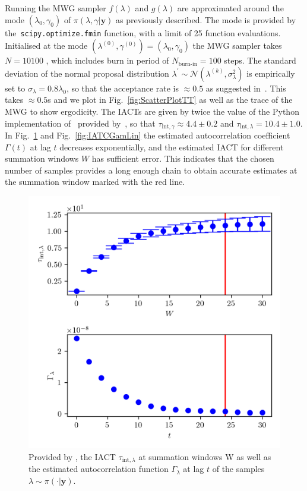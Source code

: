 Running the MWG sampler $f(\lambda)$ and $g(\lambda)$ are approximated around the mode $( \lambda_{0}, \gamma_0 )$ of $\pi(\lambda,\gamma| \bm{y})$ as previously described. 
The mode is provided by \linebreak the~\texttt{scipy.optimize.fmin} function, with a limit of 25 function evaluations.
Initialised at the mode $(\lambda^{(0)} , \gamma^{(0)}  ) = ( \lambda_{0} , \gamma_{0}  )$ the MWG sampler takes $N = 10100$ , which includes burn in period of $N_{\text{burn-in}} = 100$ steps.
The standard deviation of the normal proposal distribution $\lambda^{\prime} \sim \mathcal{N}(\lambda^{(k)} , \sigma^2_{\lambda})$ is empirically set to $\sigma_{\lambda} = 0.8 \lambda_0$, so that the acceptance rate is $\approx 0.5$ as suggested in~\cite{robertsLecNot}.
This takes  $\approx 0.5$s and we plot in Fig.~\ref{fig:ScatterPlotTT} as well as the trace of the MWG to show ergodicity.
The IACTs are given by twice the value of the Python implementation of~\cite{wolff2004monte} provided by~\cite{drikHesse}, so that $\tau_{\text{int}, \gamma} \approx 4.4 \pm 0.2$ and $\tau_{\text{int}, \lambda} = 10.4 \pm 1.0 $.
In Fig.~\ref{fig:IATCLamLin} and Fig.~\ref{fig:IATCGamLin} the estimated autocorrelation coefficient $\Gamma(t)$ at lag $t$ decreases exponentially, and the estimated IACT for different summation windows $W$ has sufficient error.
This indicates that the chosen number of samples provides a long enough chain to obtain accurate estimates at the summation window marked with the red line.
\begin{figure}[h!]
	\centering
	\includegraphics{UwerrTauIntFirstO3lam.png}
	\caption[IACT of $\lambda \sim \pi( \cdot| \bm{y})$, for linear model.]{Provided by \cite{drikHesse}, the IACT $\tau_{\text{int},\lambda}$ at summation windows W as well as the estimated autocorrelation function $\Gamma_{\lambda}$ at lag $t$ of the samples $\lambda \sim \pi( \cdot| \bm{y})$.}
	\label{fig:IATCLamLin}
\end{figure}


